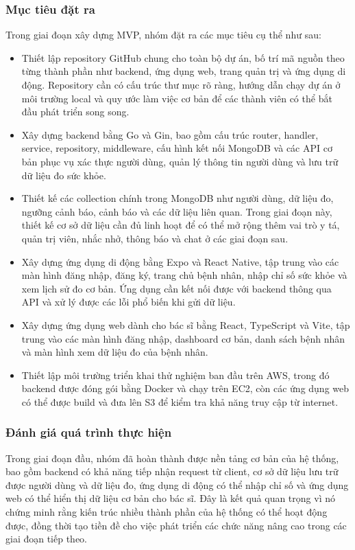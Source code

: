 \subsubsection{Mục tiêu đặt ra}
\par Trong giai đoạn xây dựng MVP, nhóm đặt ra các mục tiêu cụ thể như sau:
\begin{itemize}
    \item Thiết lập repository GitHub chung cho toàn bộ dự án, bố trí mã nguồn theo từng thành phần như backend, ứng dụng web, trang quản trị và ứng dụng di động. Repository cần có cấu trúc thư mục rõ ràng, hướng dẫn chạy dự án ở môi trường local và quy ước làm việc cơ bản để các thành viên có thể bắt đầu phát triển song song.
    \item Xây dựng backend bằng Go và Gin, bao gồm cấu trúc router, handler, service, repository, middleware, cấu hình kết nối MongoDB và các API cơ bản phục vụ xác thực người dùng, quản lý thông tin người dùng và lưu trữ dữ liệu đo sức khỏe.
    \item Thiết kế các collection chính trong MongoDB như người dùng, dữ liệu đo, ngưỡng cảnh báo, cảnh báo và các dữ liệu liên quan. Trong giai đoạn này, thiết kế cơ sở dữ liệu cần đủ linh hoạt để có thể mở rộng thêm vai trò y tá, quản trị viên, nhắc nhở, thông báo và chat ở các giai đoạn sau.
    \item Xây dựng ứng dụng di động bằng Expo và React Native, tập trung vào các màn hình đăng nhập, đăng ký, trang chủ bệnh nhân, nhập chỉ số sức khỏe và xem lịch sử đo cơ bản. Ứng dụng cần kết nối được với backend thông qua API và xử lý được các lỗi phổ biến khi gửi dữ liệu.
    \item Xây dựng ứng dụng web dành cho bác sĩ bằng React, TypeScript và Vite, tập trung vào các màn hình đăng nhập, dashboard cơ bản, danh sách bệnh nhân và màn hình xem dữ liệu đo của bệnh nhân.
    \item Thiết lập môi trường triển khai thử nghiệm ban đầu trên AWS, trong đó backend được đóng gói bằng Docker và chạy trên EC2, còn các ứng dụng web có thể được build và đưa lên S3 để kiểm tra khả năng truy cập từ internet.
\end{itemize}

\subsubsection{Đánh giá quá trình thực hiện}
\par Trong giai đoạn đầu, nhóm đã hoàn thành được nền tảng cơ bản của hệ thống, bao gồm backend có khả năng tiếp nhận request từ client, cơ sở dữ liệu lưu trữ được người dùng và dữ liệu đo, ứng dụng di động có thể nhập chỉ số và ứng dụng web có thể hiển thị dữ liệu cơ bản cho bác sĩ. Đây là kết quả quan trọng vì nó chứng minh rằng kiến trúc nhiều thành phần của hệ thống có thể hoạt động được, đồng thời tạo tiền đề cho việc phát triển các chức năng nâng cao trong các giai đoạn tiếp theo.

